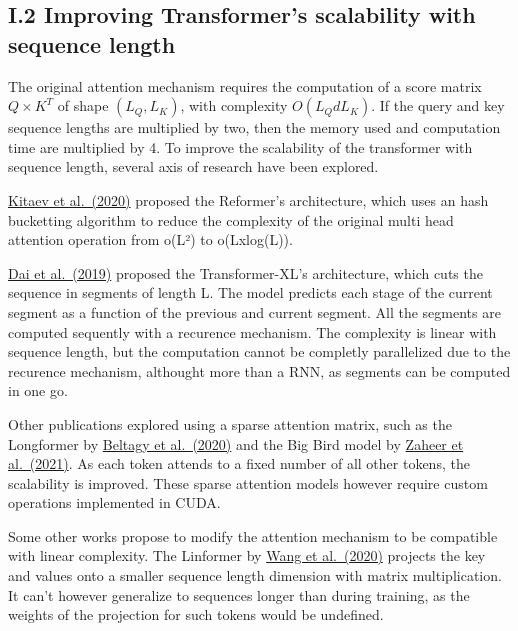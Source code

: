 \hypertarget{i.2-improving-transformers-scalability-with-sequence-length}{%
\subsection{I.2 Improving Transformer's scalability with sequence
length}\label{i.2-improving-transformers-scalability-with-sequence-length}}

The original attention mechanism requires the computation of a score
matrix \(Q \times K^T\) of shape \((L_Q, L_K)\), with complexity
\(O(L_QdL_K)\). If the query and key sequence lengths are multiplied by
two, then the memory used and computation time are multiplied by 4. To
improve the scalability of the transformer with sequence length, several
axis of research have been explored.

\href{https://arxiv.org/abs/2001.04451}{Kitaev et al.~(2020)} proposed
the Reformer's architecture, which uses an hash bucketting algorithm to
reduce the complexity of the original multi head attention operation
from o(L²) to o(Lxlog(L)).

\href{https://arxiv.org/abs/1901.02860}{Dai et al.~(2019)} proposed the
Transformer-XL's architecture, which cuts the sequence in segments of
length L. The model predicts each stage of the current segment as a
function of the previous and current segment. All the segments are
computed sequently with a recurence mechanism. The complexity is linear
with sequence length, but the computation cannot be completly
parallelized due to the recurence mechanism, althought more than a RNN,
as segments can be computed in one go.

Other publications explored using a sparse attention matrix, such as the
Longformer by \href{https://arxiv.org/abs/2004.05150}{Beltagy et
al.~(2020)} and the Big Bird model by
\href{https://arxiv.org/abs/2007.14062}{Zaheer et al.~(2021)}. As each
token attends to a fixed number of all other tokens, the scalability is
improved. These sparse attention models however require custom
operations implemented in CUDA.

Some other works propose to modify the attention mechanism to be
compatible with linear complexity. The Linformer by
\href{https://arxiv.org/abs/2006.04768}{Wang et al.~(2020)} projects the
key and values onto a smaller sequence length dimension with matrix
multiplication. It can't however generalize to sequences longer than
during training, as the weights of the projection for such tokens would
be undefined.

